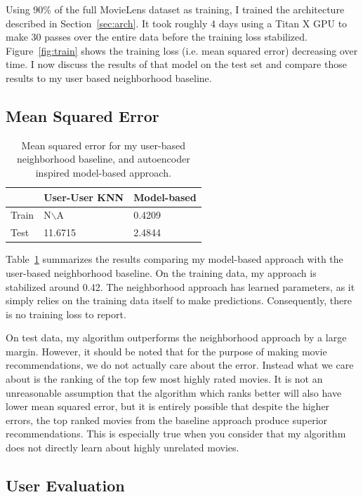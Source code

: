 \documentclass[12pt]{article}
\begin{document}
Using 90\% of the full MovieLens dataset as training, I trained the
architecture described in Section~\ref{sec:arch}.
It took roughly 4 days using a Titan X GPU to make 30 passes over the entire
data before the training loss stabilized.
Figure~\ref{fig:train} shows the training loss (i.e. mean squared error)
decreasing over time.
I now discuss the results of that model on the test set and compare those
results to my user based neighborhood baseline.

\subsection{Mean Squared Error}

\begin{table}
\centering
\begin{tabular}{|l|l|l|}
\hline
& User-User KNN & Model-based\\\hline
Train & N$\backslash$A & 0.4209\\\hline
Test & 11.6715 & 2.4844\\\hline
\end{tabular}
\caption{Mean squared error for my user-based neighborhood baseline, and
autoencoder inspired model-based approach.}
\label{tab:mse}
\end{table}

Table~\ref{tab:mse} summarizes the results comparing my model-based approach
with the user-based neighborhood baseline.
On the training data, my approach is stabilized around 0.42.
The neighborhood approach has learned parameters, as it simply relies on the
training data itself to make predictions.
Consequently, there is no training loss to report.

On test data, my algorithm outperforms the neighborhood approach by a large
margin.
However, it should be noted that for the purpose of making movie
recommendations, we do not actually care about the error.
Instead what we care about is the ranking of the top few most highly rated
movies.
It is not an unreasonable assumption that the algorithm which ranks
better will also have lower mean squared error,
but it is entirely possible that despite the higher errors, the top ranked
movies from the baseline approach produce superior recommendations.
This is especially true when you consider that my algorithm does not directly
learn about highly unrelated movies.

\subsection{User Evaluation}
\end{document}
